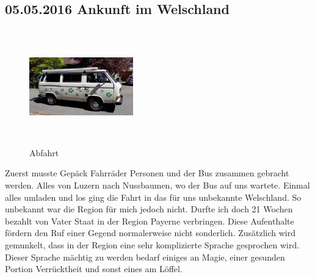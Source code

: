 % 

\subsection{05.05.2016 Ankunft im Welschland}

\begin{figure} 
  \begin{centering}
    \includegraphics[width=0.4\textwidth, height=5cm, keepaspectratio]{../Bilder/Gruyere/1.jpg}
    \caption{Abfahrt}
  \end{centering}
\end{figure} 


Zuerst musste Gepäck Fahrräder Personen und der Bus zusammen gebracht werden.
Alles von Luzern nach Nussbaumen, wo der Bus auf uns wartete.
Einmal alles umladen und los ging die Fahrt in das für uns unbekannte Welschland.
So unbekannt war die Region für mich jedoch nicht.
Durfte ich doch 21 Wochen bezahlt von Vater Staat in der Region Payerne verbringen.
Diese Aufenthalte fördern den Ruf einer Gegend normalerweise nicht sonderlich.
Zusätzlich wird gemunkelt, dass in der Region eine sehr komplizierte Sprache gesprochen wird.
Dieser Sprache mächtig zu werden bedarf einiges an Magie, einer gesunden Portion Verrücktheit und sonst eines am Löffel.

